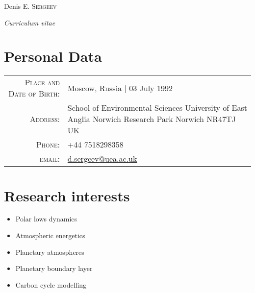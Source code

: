 \documentclass[a4paper,10pt]{article}
\begin{document}
\pagestyle{empty} %
\flushleft

\par{\centering
		{\Huge Denis E. \textsc{Sergeev} \par
		 \normalsize \textit{Curriculum vitae}
		
	}\bigskip\par}

\section{Personal Data}
\renewcommand{\arraystretch}{1.2}
\begin{tabu} to \textwidth {r|X[l]}
    \textsc{Place and Date of Birth:} & Moscow, Russia  | 03 July 1992 \\
    \textsc{Address:}   & School of Environmental Sciences \newline University of East Anglia \newline Norwich Research Park \newline Norwich \newline NR47TJ \newline UK \\
    \textsc{Phone:}     & +44 7518298358\\
    \textsc{email:}     & \href{mailto:d.sergeev@uea.ac.uk}{d.sergeev@uea.ac.uk}
\end{tabu}
\renewcommand{\arraystretch}{1}

 \renewcommand{\labelitemi}{\scriptsize$\blacksquare$} 

\section{Research interests}
\begin{itemize}
 \item Polar lows dynamics
 \item Atmospheric energetics
 \item Planetary atmospheres
 \item Planetary boundary layer
 \item Carbon cycle modelling
\end{itemize}
\end{document}
